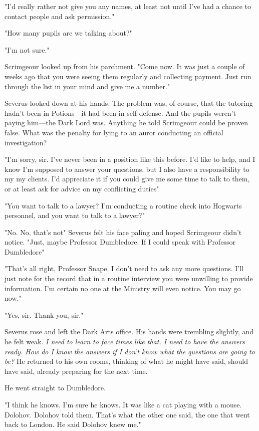 "I'd really rather not give you any names, at least not until I've had a chance to contact people and ask permission."

"How many pupils are we talking about?"

"I'm not sure."

Scrimgeour looked up from his parchment. "Come now. It was just a couple of weeks ago that you were seeing them regularly and collecting payment. Just run through the list in your mind and give me a number."

Severus looked down at his hands. The problem was, of course, that the tutoring hadn't been in Potions—it had been in self defense. And the pupils weren't paying him—the Dark Lord was. Anything he told Scrimgeour could be proven false. What was the penalty for lying to an auror conducting an official investigation?

"I'm sorry, sir. I've never been in a position like this before. I'd like to help, and I know I'm supposed to answer your questions, but I also have a responsibility to my{\el} my clients. I'd appreciate it if you could give me some time to talk to them, or at least ask for advice on my conflicting duties{\el}"

"You want to talk to a lawyer? I'm conducting a routine check into Hogwarts personnel, and you want to talk to a lawyer?"

"No. No, that's not{\el}" Severus felt his face paling and hoped Scrimgeour didn't notice. "Just, maybe Professor Dumbledore. If I could speak with Professor Dumbledore{\el}"

"That's all right, Professor Snape. I don't need to ask any more questions. I'll just note for the record that in a routine interview you were unwilling to provide information. I'm certain no one at the Ministry will even notice. You may go now."

"Yes, sir. Thank you, sir."

Severus rose and left the Dark Arts office. His hands were trembling slightly, and he felt weak. \emph{I need to learn to face times like that. I need to have the answers ready. How do I know the answers if I don't know what the questions are going to be?} He returned to his own rooms, thinking of what he might have said, should have said, already preparing for the next time.

He went straight to Dumbledore.

"I think he knows. I'm sure he knows. It was like a cat playing with a mouse. Dolohov. Dolohov told them. That's what the other one said, the one that went back to London. He said Dolohov knew me."

